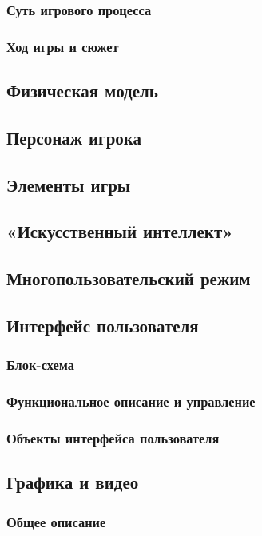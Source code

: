\documentclass{article}
\begin{document}
        \subsubsection{Суть игрового процесса}
        \subsubsection{Ход игры и сюжет}
    \subsection{Физическая модель}
    \subsection{Персонаж игрока}
    \subsection{Элементы игры}
    \subsection{«Искусственный интеллект»}
    \subsection{Многопользовательский режим}
    \subsection{Интерфейс пользователя}
        \subsubsection{Блок-схема}
        \subsubsection{Функциональное описание и управление}
        \subsubsection{Объекты интерфейса пользователя}
    \subsection{Графика и видео}
        \subsubsection{Общее описание}
\end{document}
